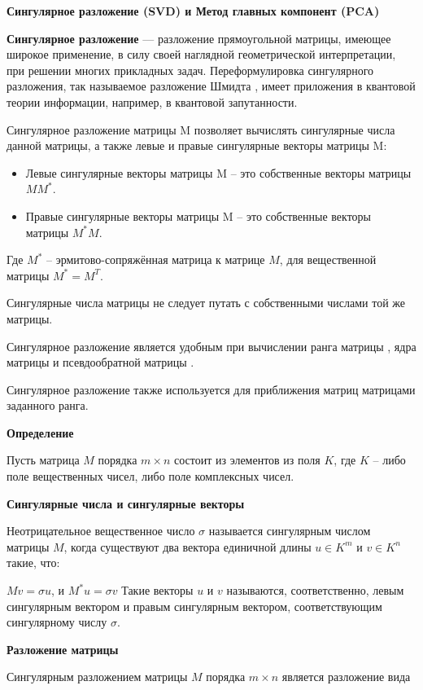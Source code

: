 {}\documentclass{article}
\begin{document}
\textbf{Сингулярное разложение (SVD) и
Метод главных компонент (PCA)}

\textbf{Сингулярное разложение} — разложение прямоугольной матрицы, имеющее широкое применение, в силу своей наглядной
геометрической интерпретации, при решении многих прикладных задач.
Переформулировка сингулярного разложения, так называемое разложение Шмидта , имеет приложения в квантовой теории
информации, например, в квантовой запутанности.

Сингулярное разложение матрицы M позволяет вычислять сингулярные числа данной матрицы,
а также левые и правые сингулярные векторы матрицы M:

\begin{itemize}
    \item Левые сингулярные векторы матрицы M -- это собственные векторы матрицы $M M^{{*}}$.
    \item Правые сингулярные векторы матрицы M -- это собственные векторы матрицы $M^{{*}} M$.
\end{itemize}

Где $M^{*}$ -- эрмитово-сопряжённая матрица к матрице $M$, для вещественной матрицы $M^{*}=M^{T}$.

Сингулярные числа матрицы не следует путать с собственными числами той же матрицы.

Сингулярное разложение является удобным при вычислении ранга матрицы , ядра матрицы и псевдообратной матрицы .

Сингулярное разложение также используется для приближения матриц матрицами заданного ранга.

\textbf{Определение}

Пусть матрица $M$ порядка $m\times n$ состоит из элементов из поля $K$, где $K$ -- либо поле вещественных чисел,
либо поле комплексных чисел.

\textbf{Сингулярные числа и сингулярные векторы}

Неотрицательное вещественное число $\sigma$ называется сингулярным числом матрицы $M$,
когда существуют два вектора единичной длины $u\in K^{m}$ и $v\in K^{n}$ такие, что:

$Mv=\sigma u$, и $M^{*}u=\sigma v$
Такие векторы $u$ и $v$ называются, соответственно, левым сингулярным вектором и правым сингулярным вектором,
соответствующим сингулярному числу $\sigma$.

\textbf{Разложение матрицы}

Сингулярным разложением матрицы $M$ порядка $m\times n$ является разложение вида
\end{document}
